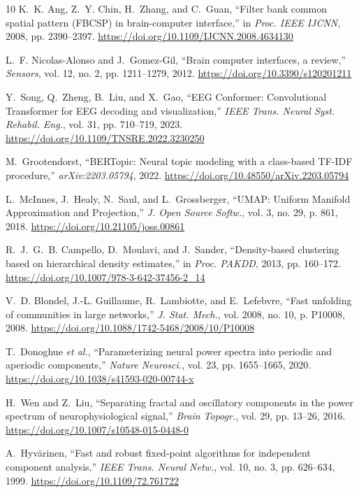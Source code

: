 \documentclass[preprint,12pt]{elsarticle}
\begin{document}
\begin{thebibliography}{10}
K.~K. Ang, Z.~Y. Chin, H.~Zhang, and C.~Guan, ``Filter bank common spatial pattern (FBCSP) in brain-computer interface,'' in \emph{Proc. IEEE IJCNN}, 2008, pp. 2390--2397. \url{https://doi.org/10.1109/IJCNN.2008.4634130}

L.~F. Nicolas-Alonso and J.~Gomez-Gil, ``Brain computer interfaces, a review,'' \emph{Sensors}, vol. 12, no. 2, pp. 1211--1279, 2012. \url{https://doi.org/10.3390/s120201211}

Y.~Song, Q.~Zheng, B.~Liu, and X.~Gao, ``EEG Conformer: Convolutional Transformer for EEG decoding and visualization,'' \emph{IEEE Trans. Neural Syst. Rehabil. Eng.}, vol. 31, pp. 710--719, 2023. \url{https://doi.org/10.1109/TNSRE.2022.3230250}

M.~Grootendorst, ``BERTopic: Neural topic modeling with a class-based TF-IDF procedure,'' \emph{arXiv:2203.05794}, 2022. \url{https://doi.org/10.48550/arXiv.2203.05794}

L.~McInnes, J.~Healy, N.~Saul, and L.~Grossberger, ``UMAP: Uniform Manifold Approximation and Projection,'' \emph{J. Open Source Softw.}, vol. 3, no. 29, p. 861, 2018. \url{https://doi.org/10.21105/joss.00861}

R.~J.~G.~B. Campello, D.~Moulavi, and J.~Sander, ``Density-based clustering based on hierarchical density estimates,'' in \emph{Proc. PAKDD}, 2013, pp. 160--172. \url{https://doi.org/10.1007/978-3-642-37456-2_14}

V.~D. Blondel, J.-L. Guillaume, R.~Lambiotte, and E.~Lefebvre, ``Fast unfolding of communities in large networks,'' \emph{J. Stat. Mech.}, vol. 2008, no. 10, p. P10008, 2008. \url{https://doi.org/10.1088/1742-5468/2008/10/P10008}

T.~Donoghue \emph{et al.}, ``Parameterizing neural power spectra into periodic and aperiodic components,'' \emph{Nature Neurosci.}, vol. 23, pp. 1655--1665, 2020. \url{https://doi.org/10.1038/s41593-020-00744-x}

H.~Wen and Z.~Liu, ``Separating fractal and oscillatory components in the power spectrum of neurophysiological signal,'' \emph{Brain Topogr.}, vol. 29, pp. 13--26, 2016. \url{https://doi.org/10.1007/s10548-015-0448-0}

A.~Hyv\"arinen, ``Fast and robust fixed-point algorithms for independent component analysis,'' \emph{IEEE Trans. Neural Netw.}, vol. 10, no. 3, pp. 626--634, 1999. \url{https://doi.org/10.1109/72.761722}


\end{thebibliography}
\end{document}
